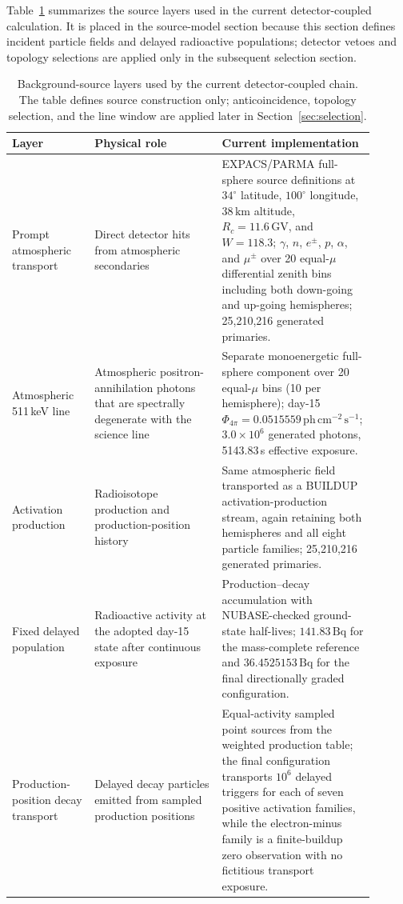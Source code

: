 \documentclass[11pt]{article}
\begin{document}
Table~\ref{tab:background_source_model} summarizes the source layers used in the
current detector-coupled calculation. It is placed in the source-model section
because this section defines incident particle fields and delayed radioactive
populations; detector vetoes and topology selections are applied only in the
subsequent selection section.

\begin{table}[t]
\centering
\caption{Background-source layers used by the current detector-coupled chain. The table defines source construction only; anticoincidence, topology selection, and the line window are applied later in Section~\ref{sec:selection}.}
\label{tab:background_source_model}
\begin{tabular}{p{0.22\linewidth}p{0.34\linewidth}p{0.34\linewidth}}
\hline
Layer & Physical role & Current implementation \\
\hline
Prompt atmospheric transport & Direct detector hits from atmospheric secondaries & EXPACS/PARMA full-sphere source definitions at $34^\circ$ latitude, $100^\circ$ longitude, $38\,\mathrm{km}$ altitude, $R_c=11.6\,\mathrm{GV}$, and $W=118.3$; $\gamma$, $n$, $e^\pm$, $p$, $\alpha$, and $\mu^\pm$ over 20 equal-$\mu$ differential zenith bins including both down-going and up-going hemispheres; 25,210,216 generated primaries. \\
Atmospheric 511\,keV line & Atmospheric positron-annihilation photons that are spectrally degenerate with the science line & Separate monoenergetic full-sphere component over 20 equal-$\mu$ bins (10 per hemisphere); day-15 $\Phi_{4\pi}=0.0515559\,\mathrm{ph\,cm^{-2}\,s^{-1}}$; $3.0\times10^6$ generated photons, 5143.83\,s effective exposure. \\
Activation production & Radioisotope production and production-position history & Same atmospheric field transported as a BUILDUP activation-production stream, again retaining both hemispheres and all eight particle families; 25,210,216 generated primaries. \\
Fixed delayed population & Radioactive activity at the adopted day-15 state after continuous exposure & Production--decay accumulation with NUBASE-checked ground-state half-lives; $141.83\,\mathrm{Bq}$ for the mass-complete reference and $36.4525153\,\mathrm{Bq}$ for the final directionally graded configuration. \\
Production-position decay transport & Delayed decay particles emitted from sampled production positions & Equal-activity sampled point sources from the weighted production table; the final configuration transports $10^6$ delayed triggers for each of seven positive activation families, while the electron-minus family is a finite-buildup zero observation with no fictitious transport exposure. \\
\hline
\end{tabular}
\end{table}
\end{document}
